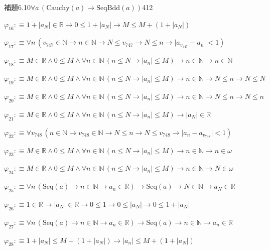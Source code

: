 \begin{fullproof}{補題6.10}{$\forall a\,(\mathrm{Cauchy}(a) \to \mathrm{SeqBdd}(a))$}{412}
\begin{abbrevlist}
\item $\varphi_{16} :\equiv 1 + \lvert a_{N} \rvert \in \mathbb{R} \to 0 \leq 1 + \lvert a_{N} \rvert \to M \leq M + (1 + \lvert a_{N} \rvert)$
\item $\varphi_{17} :\equiv \forall n\,(v_{747} \in \mathbb{N} \to n \in \mathbb{N} \to N \leq v_{747} \to N \leq n \to \lvert a_{v_{747}} - a_{n} \rvert < 1)$
\item $\varphi_{18} :\equiv M \in \mathbb{R} \land 0 \leq M \land \forall n \in \mathbb{N}\,(n \leq N \to \lvert a_{n} \rvert \leq M) \to n \in \mathbb{N} \to n \in \mathbb{N}$
\item $\varphi_{19} :\equiv M \in \mathbb{R} \land 0 \leq M \land \forall n \in \mathbb{N}\,(n \leq N \to \lvert a_{n} \rvert \leq M) \to n \in \mathbb{N} \to N \leq n \to N \leq N$
\item $\varphi_{20} :\equiv M \in \mathbb{R} \land 0 \leq M \land \forall n \in \mathbb{N}\,(n \leq N \to \lvert a_{n} \rvert \leq M) \to n \in \mathbb{N} \to N \leq n \to N \leq n$
\item $\varphi_{21} :\equiv M \in \mathbb{R} \land 0 \leq M \land \forall n \in \mathbb{N}\,(n \leq N \to \lvert a_{n} \rvert \leq M) \to \lvert a_{N} \rvert \in \mathbb{R}$
\item $\varphi_{22} :\equiv \forall v_{748}\,(n \in \mathbb{N} \to v_{748} \in \mathbb{N} \to N \leq n \to N \leq v_{748} \to \lvert a_{n} - a_{v_{748}} \rvert < 1)$
\item $\varphi_{23} :\equiv M \in \mathbb{R} \land 0 \leq M \land \forall n \in \mathbb{N}\,(n \leq N \to \lvert a_{n} \rvert \leq M) \to n \in \mathbb{N} \to n \in \omega$
\item $\varphi_{24} :\equiv M \in \mathbb{R} \land 0 \leq M \land \forall n \in \mathbb{N}\,(n \leq N \to \lvert a_{n} \rvert \leq M) \to n \in \mathbb{N} \to N \in \omega$
\item $\varphi_{25} :\equiv \forall n\,(\mathrm{Seq}(a) \to n \in \mathbb{N} \to a_{n} \in \mathbb{R}) \to \mathrm{Seq}(a) \to N \in \mathbb{N} \to a_{N} \in \mathbb{R}$
\item $\varphi_{26} :\equiv 1 \in \mathbb{R} \to \lvert a_{N} \rvert \in \mathbb{R} \to 0 \leq 1 \to 0 \leq \lvert a_{N} \rvert \to 0 \leq 1 + \lvert a_{N} \rvert$
\item $\varphi_{27} :\equiv \forall n\,(\mathrm{Seq}(a) \to n \in \mathbb{N} \to a_{n} \in \mathbb{R}) \to \mathrm{Seq}(a) \to n \in \mathbb{N} \to a_{n} \in \mathbb{R}$
\item $\varphi_{28} :\equiv 1 + \lvert a_{N} \rvert \leq M + (1 + \lvert a_{N} \rvert) \to \lvert a_{n} \rvert \leq M + (1 + \lvert a_{N} \rvert)$

\end{abbrevlist}
\end{fullproof}
